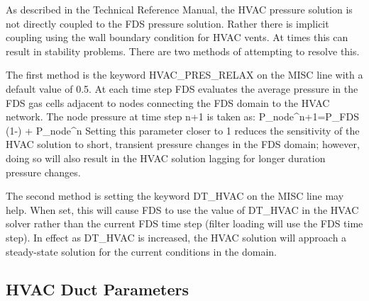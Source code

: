 \documentclass[11pt]{book}
\begin{document}
As described in the Technical Reference Manual, the HVAC pressure solution is not directly coupled to the FDS pressure solution. Rather there is implicit coupling using the wall boundary condition for HVAC vents. At times this can result in stability problems. There are two methods of attempting to resolve this.

The first method is the keyword {\ct HVAC\_PRES\_RELAX} on the {\ct MISC} line with a default value of 0.5. At each time step FDS evaluates the average pressure in the FDS gas cells adjacent to nodes connecting the FDS domain to the HVAC network. The node pressure at time step n+1 is taken as:
\be
P_{node}^{n+1}=P_{FDS} \; (1-{}) \; + \; P_{node}^n \; {}
\ee
Setting this parameter closer to 1 reduces the sensitivity of the HVAC solution to short, transient pressure changes in the FDS domain; however, doing so will also result in the HVAC solution lagging for longer duration pressure changes.

The second method is setting the keyword {\ct DT\_HVAC} on the {\ct MISC} line may help. When set, this will cause FDS to use the value of {\ct DT\_HVAC} in the HVAC solver rather than the current FDS time step (filter loading will use the FDS time step). In effect as {\ct DT\_HVAC} is increased, the HVAC solution will approach a steady-state solution for the current conditions in the domain.

\subsection{HVAC Duct Parameters}
\label{info:HVACduct}
\end{document}
